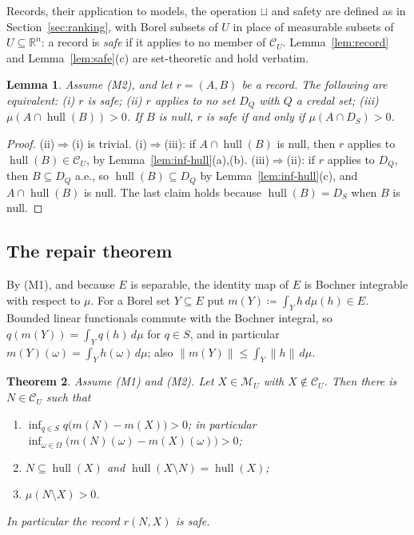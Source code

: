 \documentclass[11pt]{article}
\newcommand{\R}{\mathbb{R}}
\newcommand{\M}{\mathcal{M}}
\newcommand{\CC}{\mathcal{C}}
\newcommand{\hull}{\operatorname{hull}}
\theoremstyle{plain}
\newtheorem{theorem}{Theorem}[section]
\newtheorem{lemma}[theorem]{Lemma}
\theoremstyle{definition}
\theoremstyle{remark}
\begin{document}
Records, their application to models, the operation $\sqcup$ and safety are defined as in
Section~\ref{sec:ranking}, with Borel subsets of $U$ in place of measurable subsets of
$U\subseteq\R^n$: a record is \emph{safe} if it applies to no member of $\CC_U$.
Lemma~\ref{lem:record} and Lemma~\ref{lem:safe}(c) are set-theoretic and hold verbatim.

\begin{lemma}\label{lem:inf-safe}
Assume (M2), and let $r=(A,B)$ be a record. The following are equivalent: (i) $r$ is
safe; (ii) $r$ applies to no set $D_Q$ with $Q$ a credal set; (iii)
$\mu(A\cap\hull(B))>0$. If $B$ is null, $r$ is safe if and only if $\mu(A\cap D_S)>0$.
\end{lemma}

\begin{proof}
(ii)$\Rightarrow$(i) is trivial. (i)$\Rightarrow$(iii): if $A\cap\hull(B)$ is null, then
$r$ applies to $\hull(B)\in\CC_U$, by Lemma~\ref{lem:inf-hull}(a),(b).
(iii)$\Rightarrow$(ii): if $r$ applies to $D_Q$, then $B\subseteq D_Q$ a.e., so
$\hull(B)\subseteq D_Q$ by Lemma~\ref{lem:inf-hull}(c), and $A\cap\hull(B)$ is null. The
last claim holds because $\hull(B)=D_S$ when $B$ is null.
\end{proof}

\subsection{The repair theorem}

By (M1), and because $E$ is separable, the identity map of $E$ is Bochner integrable with
respect to $\mu$. For a Borel set $Y\subseteq E$ put $m(Y)\coloneqq\int_Yh\,d\mu(h)\in E$.
Bounded linear functionals commute with the Bochner integral, so $q(m(Y))=\int_Yq(h)\,
d\mu$ for $q\in S$, and in particular $m(Y)(\omega)=\int_Yh(\omega)\,d\mu$; also $\|m(Y)
\|\le\int_Y\|h\|\,d\mu$.

\begin{theorem}\label{thm:Hinf}
Assume (M1) and (M2). Let $X\in\M_U$ with $X\notin\CC_U$. Then there is $N\in\CC_U$ such
that
\begin{enumerate}[label=(\roman*)]
  \item $\inf_{q\in S}q\bigl(m(N)-m(X)\bigr)>0$; in particular $\inf_{\omega\in\Omega}
  \bigl(m(N)(\omega)-m(X)(\omega)\bigr)>0$;
  \item $N\subseteq\hull(X)$ and $\hull(X\setminus N)=\hull(X)$;
  \item $\mu(N\setminus X)>0$.
\end{enumerate}
In particular the record $r(N,X)$ is safe.
\end{theorem}
\end{document}
